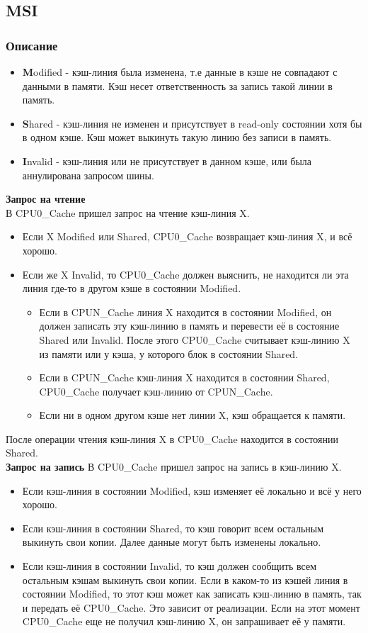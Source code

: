 \documentclass[12pt, a4paper]{article}
\begin{document}
\subsection{MSI}
\subsubsection{Описание}
\begin{itemize}
    \item \textbf{M}odified - кэш-линия была изменена, т.е данные в кэше не совпадают с данными в памяти. Кэш несет ответственность за запись такой линии в память.
    \item \textbf{S}hared - кэш-линия не изменен и присутствует в read-only состоянии хотя бы в одном кэше. Кэш может выкинуть такую линию без записи в память.
    \item \textbf{I}nvalid - кэш-линия или не присутствует в данном кэше, или была аннулирована запросом шины.
\end{itemize}
\textbf{Запрос на чтение}\\
В CPU0\_Cache пришел запрос на чтение кэш-линия X.
\begin{itemize}
    \item Если X Modified или Shared, CPU0\_Cache возвращает кэш-линия X, и всё хорошо.
    \item Если же X Invalid, то CPU0\_Cache должен выяснить, не находится ли эта линия где-то в другом кэше в состоянии Modified.
    \begin{itemize}
        \item Если в CPUN\_Cache линия X находится в состоянии Modified, он должен записать эту кэш-линию в память и перевести её в состояние Shared или Invalid. После этого CPU0\_Cache считывает кэш-линию X из памяти или у кэша, у которого блок в состоянии Shared.
        \item Если в CPUN\_Cache кэш-линия X находится в состоянии Shared, CPU0\_Cache получает кэш-линию от CPUN\_Cache.
        \item Если ни в одном другом кэше нет линии X, кэш обращается к памяти.
    \end{itemize}
\end{itemize}
После операции чтения кэш-линия X в CPU0\_Cache находится в состоянии Shared.\\
\textbf{Запрос на запись}
В CPU0\_Cache пришел запрос на запись в кэш-линию X.
\begin{itemize}
    \item Если кэш-линия в состоянии Modified, кэш изменяет её локально и всё у него хорошо.
    \item Если кэш-линия в состоянии Shared, то кэш говорит всем остальным выкинуть свои копии. Далее данные могут быть изменены локально.
    \item Если кэш-линия в состоянии Invalid, то кэш должен сообщить всем остальным кэшам выкинуть свои копии. Если в каком-то из кэшей линия в состоянии Modified, то этот кэш может как записать кэш-линию в память, так и передать её CPU0\_Cache. Это зависит от реализации. Если на этот момент CPU0\_Cache еще не получил кэш-линию X, он запрашивает её у памяти.
\end{itemize}
\end{document}

